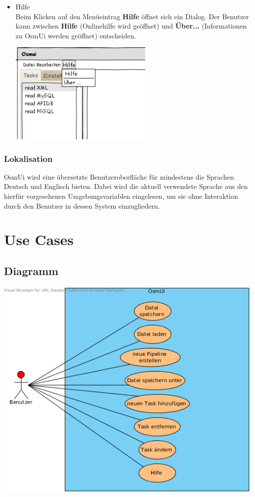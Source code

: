 \documentclass[a4paper,12pt]{scrartcl}
\begin{document}
\begin{itemize}
\item Hilfe\\
Beim Klicken auf den Menüeintrag \textbf{Hilfe} öffnet sich ein Dialog. Der Benutzer kann zwischen \textbf{Hilfe} (Onlinehilfe wird geöffnet) und \textbf{Über...} (Informationen zu OsmUi werden geöffnet) entscheiden.
\\
\begin{center}
\includegraphics[width=7cm]{ui_prototype/OsmUi_Hilfeklein.png}
\end{center}
\end{itemize}

\subsubsection{Lokalisation}
OsmUi wird eine übersetzte Benutzeroberfläche für mindestens die Sprachen Deutsch und Englisch bieten. Dabei wird die aktuell verwendete
Sprache aus den hierfür vorgesehenen Umgebungsvariablen eingelesen, um sie ohne Interaktion durch den Benutzer in dessen System einzugliedern.
\newpage
\section{Use Cases}
\subsection{Diagramm}
\begin{center}
\includegraphics[width=15cm]{Use-Cases.png}
\end{center}
\end{document}
